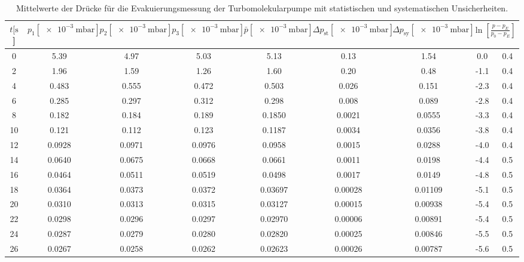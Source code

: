 \begin{table}[H]
  \centering
    \caption{Mittelwerte der Drücke für die Evakuierungsmessung der Turbomolekularpumpe mit statistischen und systematischen Unsicherheiten.}
    \label{tab:Turbo_Evak}
    \tiny{
    \begin{tabular}{
      S[table-format=2.0] 
      S[table-format=1.4] S[table-format=1.4] S[table-format=1.4]
      S[table-format=1.5] S[table-format=1.5] S[table-format=1.4] S @{${}\pm{}$} S
      }
      \toprule
      {$t [\si{\second}$]} & 
      {$p_1 [\SI{e-3}{\milli\bar}]$} & 
      {$p_2 [\SI{e-3}{\milli\bar}]$} & 
      {$p_3 [\SI{e-3}{\milli\bar}]$} & 
      {$\bar{p} [\SI{e-3}{\milli\bar}]$} & 
      {$\Delta p_\text{st} [\SI{e-3}{\milli\bar}]$} & 
      {$\Delta p_\text{sy} [\SI{e-3}{\milli\bar}]$} & 
       \\
          & 5.39   & 4.97   & 5.03   & 5.13    & 0.13    & 1.54    & 0.0  & 0.4 \\
      2    & 1.96   & 1.59   & 1.26   & 1.60    & 0.20    & 0.48    & -1.1 & 0.4 \\
      4    & 0.483  & 0.555  & 0.472  & 0.503   & 0.026   & 0.151   & -2.3 & 0.4 \\
      6    & 0.285  & 0.297  & 0.312  & 0.298   & 0.008   & 0.089   & -2.8 & 0.4 \\
      8    & 0.182  & 0.184  & 0.189  & 0.1850  & 0.0021  & 0.0555  & -3.3 & 0.4 \\
      10   & 0.121  & 0.112  & 0.123  & 0.1187  & 0.0034  & 0.0356  & -3.8 & 0.4 \\
      12   & 0.0928 & 0.0971 & 0.0976 & 0.0958  & 0.0015  & 0.0288  & -4.0 & 0.4 \\
      14   & 0.0640 & 0.0675 & 0.0668 & 0.0661  & 0.0011  & 0.0198  & -4.4 & 0.5 \\
      16   & 0.0464 & 0.0511 & 0.0519 & 0.0498  & 0.0017  & 0.0149  & -4.8 & 0.5 \\
      18   & 0.0364 & 0.0373 & 0.0372 & 0.03697 & 0.00028 & 0.01109 & -5.1 & 0.5 \\
      20   & 0.0310 & 0.0313 & 0.0315 & 0.03127 & 0.00015 & 0.00938 & -5.4 & 0.5 \\
      22   & 0.0298 & 0.0296 & 0.0297 & 0.02970 & 0.00006 & 0.00891 & -5.4 & 0.5 \\
      24   & 0.0287 & 0.0279 & 0.0280 & 0.02820 & 0.00025 & 0.00846 & -5.5 & 0.5 \\
      26   & 0.0267 & 0.0258 & 0.0262 & 0.02623 & 0.00026 & 0.00787 & -5.6 & 0.5 \\

\end{tabular}}
\end{table}
